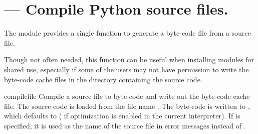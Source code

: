 
\section{ ---
         Compile Python source files.}




The  module provides a single function to generate
a byte-code file from a source file.

Though not often needed, this function can be useful when installing
modules for shared use, especially if some of the users may not have
permission to write the byte-code cache files in the directory
containing the source code.


\begin{funcdesc}{compile}{file}
  Compile a source file to byte-code and write out the byte-code cache 
  file.  The source code is loaded from the file name .  The 
  byte-code is written to , which defaults to 
  \code{+}  ( if optimization is enabled in the
  current interpreter).  If  is specified, it is used as
  the name of the source file in error messages instead of . 
\end{funcdesc}


\begin{seealso}
\end{seealso}
